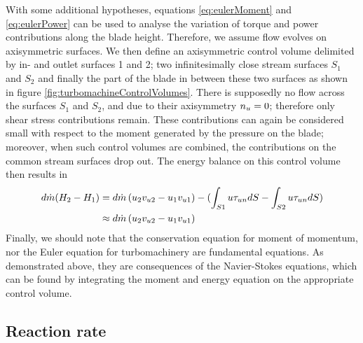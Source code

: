 With some additional hypotheses, equations \ref{eq:eulerMoment} and
\ref{eq:eulerPower} can be used to analyse the variation of
torque and power contributions along the blade height. Therefore, we
assume flow evolves on axisymmetric surfaces. We then define an
axisymmetric control volume delimited by in- and outlet surfaces 1 and
2; two infinitesimally close stream surfaces $S_1$ and $S_2$ and
finally the part of the blade in between these two surfaces as shown
in figure \ref{fig:turbomachineControlVolumes}. There is supposedly no
flow across the surfaces $S_1$ and $S_2$, and due to their axisymmetry
$n_u = 0$; therefore only shear stress contributions remain. These
contributions can again be considered small with respect to the moment
generated by the pressure on the blade; moreover, when such control
volumes are combined, the contributions on the common stream surfaces
drop out. The energy balance on this control volume then results in
\begin{equation}
  \begin{split}
  d \dot m (H_2 - H_1) 
  &= d \dot m \left(
    {u_2 v_{u2}} - 
    {u_1 v_{u1}}\right)  - (\int_{S1} u \tau_{un} dS 
  - \int_{S2} u \tau_{un} dS) \\
  &\approx d \dot m \left(
    {u_2 v_{u2}} - 
    {u_1 v_{u1}}\right) 
  \end{split}
  \label{eq:eulerInfinitesimal}
\end{equation}
Finally, we should note that the conservation equation for moment of
momentum, nor the Euler equation for turbomachinery are fundamental
equations. As demonstrated above, they are consequences of the
Navier-Stokes equations, which can be found by integrating the moment
and energy equation on the appropriate control volume.

\subsection{Reaction rate}

